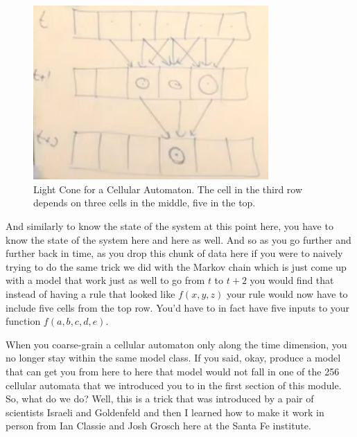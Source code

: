 \documentclass[]{article}
\begin{document}
\begin{figure}[H]
	\begin{center}
		\caption[Light Cone for a Cellular Automaton]{Light Cone for a Cellular Automaton. The cell in the third row depends on three cells in the middle, five in the top.}
		\includegraphics[width=0.8\textwidth]{cellular-automaton-light-cone}
	\end{center}
\end{figure}

And similarly to know the state of the system at this point here, you have to know the state of the system here and here as well.
And so as you go further and further back in time, as you drop this chunk of data here if you were to naively trying to do the same trick we did with the Markov chain
which is just come up with a model that work just as well to go from $t$ to $t+2$ you would find that instead of having a rule that looked like $f(x,y,z)$ your rule would now have to include five cells from the top row.
You'd have to in fact have five inputs to your function $f(a,b,c,d,e)$.

When you coarse-grain a cellular automaton only along the time dimension, you no longer stay within the same model class.
If you said, okay, produce a model that can get you from here to here that model would not fall in one of the 256 cellular automata that we introduced you to
in the first section of this module.
So, what do we do? Well, this is a trick that was introduced by a pair of scientists
Israeli and Goldenfeld\cite{israeli2004computational,israeli2006coarse}
and then I learned how to make it work in person from Ian Classie and Josh Grosch here at the Santa Fe institute.
\end{document}
